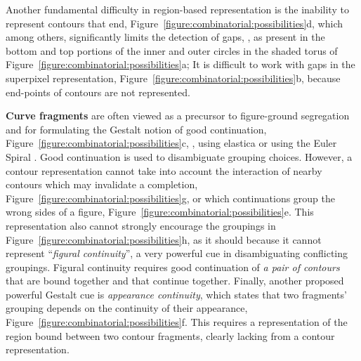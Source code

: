 Another fundamental difficulty in region-based representation is the inability to represent contours that end, Figure~\ref{figure:combinatorial:possibilities}d, which among others,  significantly limits the detection of gaps,
\eg, as present in the bottom and top portions of the inner and outer circles
in the shaded torus of Figure~\ref{figure:combinatorial:possibilities}a; It is difficult to work with gaps in the superpixel representation, Figure~\ref{figure:combinatorial:possibilities}b, because end-points of contours are
not represented.



  

\textbf{Curve fragments} are often viewed as a precursor to figure-ground segregation and for formulating the Gestalt notion of good continuation,
Figure~\ref{figure:combinatorial:possibilities}c,
\eg, using elastica \cite{Mumford:Elastic:1994,Williams:Jacobs:NC95} or using the Euler Spiral \cite{Kimia:Euler:Spiral:IJCV03}. Good continuation is used to disambiguate grouping choices. However, a contour representation cannot take into account the interaction of nearby contours  which may invalidate a completion,
Figure~\ref{figure:combinatorial:possibilities}g, or which continuations group the wrong
sides of a figure, Figure~\ref{figure:combinatorial:possibilities}e. This representation also cannot  strongly encourage the groupings
in Figure~\ref{figure:combinatorial:possibilities}h, as it should because it cannot represent 
``\textit{figural continuity}'', a very  powerful cue in disambiguating conflicting groupings. Figural continuity requires good continuation of \textit{a pair of contours} that are bound together and that continue together. Finally, another proposed powerful
Gestalt cue is   \textit{appearance continuity}, which states that two
fragments' grouping depends on the continuity of their appearance, Figure~\ref{figure:combinatorial:possibilities}f. This requires a representation of the region bound between two contour fragments, clearly lacking from a contour representation.  




